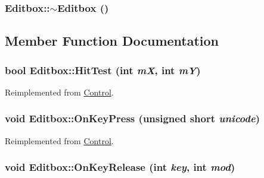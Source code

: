 \hypertarget{class_editbox_e7644c25521d41d57a1d76f2c2e904dd}{
\subsubsection[{$\sim$Editbox}]{\setlength{\rightskip}{0pt plus 5cm}Editbox::$\sim$Editbox ()}}
\label{class_editbox_e7644c25521d41d57a1d76f2c2e904dd}




\subsection{Member Function Documentation}
\hypertarget{class_editbox_2eacf0b4a9e2f2fd20125658156fb4e0}{
\subsubsection[{HitTest}]{\setlength{\rightskip}{0pt plus 5cm}bool Editbox::HitTest (int {\em mX}, \/  int {\em mY})}}
\label{class_editbox_2eacf0b4a9e2f2fd20125658156fb4e0}




Reimplemented from \hyperlink{class_control_6b586494213774ccc17b161f8ed14888}{Control}.\hypertarget{class_editbox_03de7605a4541011037378e745012f17}{
\subsubsection[{OnKeyPress}]{\setlength{\rightskip}{0pt plus 5cm}void Editbox::OnKeyPress (unsigned short {\em unicode})}}
\label{class_editbox_03de7605a4541011037378e745012f17}




Reimplemented from \hyperlink{class_control_381e61b70477155845f58a2d17b91c6a}{Control}.\hypertarget{class_editbox_47d72239d116c6574d2f14a84aa658cb}{
\subsubsection[{OnKeyRelease}]{\setlength{\rightskip}{0pt plus 5cm}void Editbox::OnKeyRelease (int {\em key}, \/  int {\em mod})}}
\label{class_editbox_47d72239d116c6574d2f14a84aa658cb}




